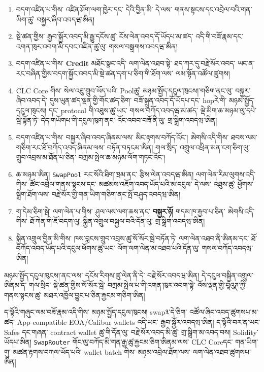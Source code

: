 \documentclass[11pt]{article}
\begin{document}
\begin{enumerate}[leftmargin=*]
\item བདག་འཛིན་པ་གིས་ འཛིན་ཤོག་ལག་ཁྱེར་དང་ དེའི་བྱིན་མི་ དེ་ལས་ གནས་སྟངས་དང་འབྲེལ་བའི་གན་ཡིག་ཚུ་ བསྐྱར་ཞིབ་འབདཝ་ཨིན།
\item སྡེ་ཚན་གྱིས་ རྒྱབ་སྐྱོར་འབད་མི་རྒྱུ་དངོས་ཚུ་ ངོས་ལེན་འབད་དོ་ཡོདཔ་མ་ཚད་ འདི་གི་བཟོ་རྣམ་དང་ འགན་ཁུར་འབག་མི་དབང་འཛིན་ཚུ་ལུ་ གསལ་བསྒྲགས་འབདཝ་ཨིན།
\item བདག་འཛིན་པ་གིས་ \textbf{Credit} མཐོང་སྣང་འདི་ ལག་ལེན་འཐབ་སྟེ་ ཐད་ཀར་དུ་བརྗེ་སོར་འབད་ ཡང་ན་ རང་བཞིན་གྱིས་བདག་སྐྱོང་འབད་མི་སྡེ་ཚན་དག་པ་ཅིག་གི་ཐོག་ལས་ ལམ་སྟོན་འཚོལ་ཚུགས།
\item CLC Core གིས་ སེལ་འཐུ་གྲུབ་ཡོད་པའི་ Poolཚུ་ མཉམ་སྤྱོད་དངུལ་ཁུངས།་གཅིག་ནང་ལུ་ བསྐྱར་ཞིབ་འབད་དེ་ དུས་ཡུན་ཚད་ལྡན་གྱི་གོང་ཚད་ཅིག་ བཟོ་སྐྲུན་འབད་དོ་ཡོདཔ་དང་ hopརེ་གི་ མཉམ་སྤྱོད་དངུལ་ཁུངས། དང་ protocol གི་འཐུས་ཚུ་ཡང་ གསལ་བཀོད་འབདཝ་མ་ཚད་ ལྡེ་མིག་ཆ་མཉམ་ལུ་དཔེ་སྦེ་སྟོན་ཏེ་ དེད་གཡོགཔ་གི་དངུལ་ཁུག་ནང་ འོང་འབབ་བཟོ་ནི་ལུ་ གྲ་སྒྲིག་འབདཝ་ཨིན།
\item བདག་འཛིན་པ་གིས་ བསྐྱར་ཞིབ་འབད་ཞིནམ་ལས་ མིང་རྟགས་བཀོད་འོང་། ཨེགསི་འདི་གིས་ ཐབས་ལམ་གཅིག་རང་ཐོ་བཀོད་འབད་ཞིནམ་ལས་ བཏོན་བཏངམ་ཨིན། གལ་སྲིད་ འགྲུལ་འཕྲིན་མན་ངག་ཅིག་ལུ་ གྲུབ་འབྲས་མ་ཐོན་པ་ཅིན་ བཀྲམ་སྤེལ་ཆ་མཉམ་ལོག་གཏང་འོང་།
\item ཆ་མཉམ་ཨིན། \texttt{SwapPool} རང་སོའི་ཐིག་ཁྲམ་ནང་ རྩིས་ལེན་འབདཝ་ཨིན། ལག་ལེན་རིམ་ལུགས་འདི་གིས་ ཚོང་འབྲེལ་གནས་སྟངས་དང་ མཚམས་འཇོག་འབད་ཡོད་པའི་མ་དངུལ་ དེ་ལས་ འཐུས་ཚུ་ ཕྱོགས་སྒྲིག་ཐོག་ལས་ བརྗེ་སོར་གྱི་གན་ཡིག་གཅིག་ནང་སྤོ་བཤུད་འབདཝ་ཨིན།
\item ག་དེམ་ཅིག་སྦེ་ ལག་ལེན་པ་གིས་ ཤུལ་ལས་ལག་ཆས་ནང་ \textbf{བསྐྱར་ཉོ།} གདམ་ཁ་རྐྱབ་པ་ཅིན་ ཨེགསི་འདི་གིས་ ཐོ་ཀེན་གི་ཇོ་བདག་ལུ་ སྐྱིན་འགྲུལ་བསྐྱལ་བའི་དོན་ལུ་ གྲ་སྒྲིག་འབདཝ་ཨིན།
\item སྐྱིན་འགྲུལ་བྱིན་མི་གིས་ ཁས་བླངས་གྲུབ་འབྲས་ཚུ་སོ་སོར་སྦེ་བཏོན་ཏེ་ ལག་ལེན་འཐབ་ནི་ཨིནམ་དང་ ཐོ་བཀོད་འབད་ཡོད་པའི་དངུལ་ཕོགས་ཚུ་ཡང་ ལོག་ལག་ལེན་མ་འཐབ་པའི་དོན་ལུ་ གསལ་བཀོད་འབདཝ་ཨིན།
\end{enumerate}
མཉམ་སྤྱོད་དངུལ་ཁུངས།་ནང་ལས་ དངོས་རིགས་ཚུ་ལེན་ནི་དེ་ བརྗེ་སོར་འབདཝ་ཨིན། དེ་དངུལ་བསྐྱིན་འགྲུལ་ཨིནམ་ད་ གལ་སྲིད་ སྡེ་ཚན་གྱིས་སོ་སོར་སྦེ་ བཀྲམ་སྤེལ་པ་གི་འགན་ཁུར་འབག་སྟེ་ འོས་ལྡན་གྱི་བཱའུཊ་ཀྱི་གནས་སྟངས་ཚུ་ མཐར་འཁྱོལ་བྱུང་པ་ཅིན་རྐྱངམ་གཅིག་ཨིན།

ད་ལྟོའི་གཞུང་ལམ་བཟོ་རྣམ་འདི་གིས་ མཉམ་སྤྱོད་དངུལ་ཁུངས། swap༣་དེ་ཅིག་ འཚོལ་ཞིབ་འབད་ཚུགསཔ་མ་ཚད་ App-compatible EOA/Calibur wallets འདི་ཡང་ རྒྱབ་སྐྱོར་འབདཝ་ཨིན། ད་ལྟོའི་བར་ན་ཡང་ Safes དང་གཞན་ contract wallet ཚུ་གི་དོན་ལུ་ བརྗེ་སོར་འབད་མི་ཚུ་ གྲ་སྒྲིག་མ་འབད་བས། Solidity་ཡོདཔ་ཨིན། \texttt{SwapRouter} གོང་ལུ་བཀོད་མི་གན་རྒྱ་ཚུ་རྐྱངམ་ཅིག་ཨིནམ་ལས་ CLC Coreདང་ གན་ཡིག་གུ་ མཚན་རྟགས་བཀལ་ཡོད་པའི་ wallet batch གིས་ མཉམ་འབྲེལ་ཐོག་ལས་ ལག་ལེན་འཐབ་ཚུགསཔ་ཨིན།
\end{document}
